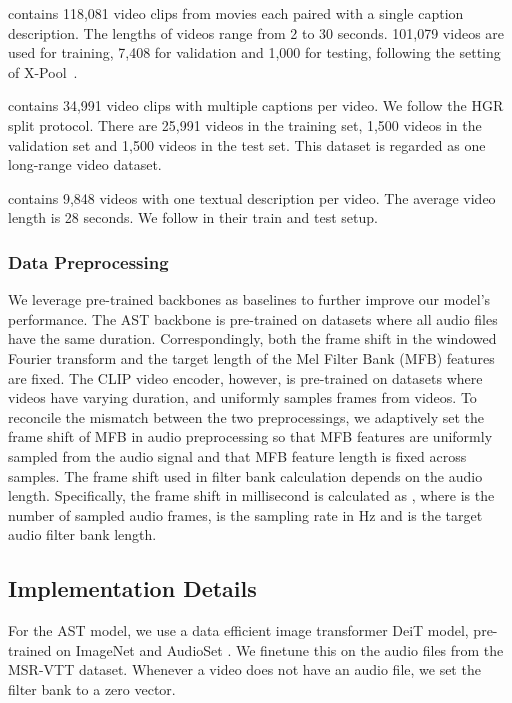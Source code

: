 \documentclass[10pt,twocolumn,letterpaper]{article}
\begin{document}
 contains 118,081 video clips from movies each paired with a single caption description. The lengths of videos range from 2 to 30 seconds. 101,079 videos are used for training, 7,408 for validation and 1,000 for testing, following the setting of X-Pool~\cite{gorti2022xpool}.

 \cite{vatex} contains 34,991 video clips with multiple captions per video. We follow the HGR \cite{hgr} split protocol. There are 25,991 videos in the training set, 1,500 videos in the validation set and 1,500 videos in the test set. This dataset is regarded as one long-range video dataset.

 \cite{charades} contains 9,848 videos with one textual description per video. The average video length is 28 seconds. We follow \cite{ECLIPSE_ECCV22} in their train and test setup.

\subsubsection{Data Preprocessing} We leverage pre-trained backbones 
 as baselines to further improve our model's performance. The AST backbone is pre-trained on datasets where all audio files have the same duration. Correspondingly, both the frame shift  in the windowed Fourier transform and the target length  of the Mel Filter Bank (MFB) features are fixed. The CLIP video encoder, however, is pre-trained on datasets where videos have varying duration, and uniformly samples frames from videos. To reconcile the mismatch between the two preprocessings, we adaptively set the frame shift of MFB in audio preprocessing so that MFB features are uniformly sampled from the audio signal and that MFB feature length is fixed across samples. The frame shift used in filter bank calculation depends on the audio length. Specifically, the frame shift  in millisecond is calculated as , where  is the number of sampled audio frames,  is the sampling rate in Hz and  is the target audio filter bank length.

\subsection{Implementation Details}
For the AST model, we use a data efficient image transformer DeiT \cite{deit} model, pre-trained on ImageNet and AudioSet \cite{audioset}. We finetune this on the audio files from the MSR-VTT dataset. Whenever a video does not have an audio file, we set the filter bank to a zero vector.
\end{document}
